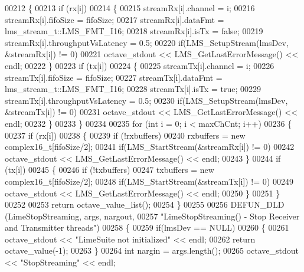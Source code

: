 \begin{DoxyCode}
00212     \{
00213         \textcolor{keywordflow}{if} (rx[i])
00214         \{
00215             streamRx[i].channel = i;
00216             streamRx[i].fifoSize = fifoSize;
00217             streamRx[i].dataFmt = lms_stream_t::LMS_FMT_I16;
00218             streamRx[i].isTx = \textcolor{keyword}{false};
00219             streamRx[i].throughputVsLatency = 0.5;
00220             \textcolor{keywordflow}{if}(LMS_SetupStream(lmsDev, &streamRx[i]) != 0)
00221                 octave\_stdout << LMS_GetLastErrorMessage() << endl;
00222         \}
00223         \textcolor{keywordflow}{if} (tx[i])
00224         \{
00225             streamTx[i].channel = i;
00226             streamTx[i].fifoSize = fifoSize;
00227             streamTx[i].dataFmt = lms_stream_t::LMS_FMT_I16;
00228             streamTx[i].isTx = \textcolor{keyword}{true};
00229             streamTx[i].throughputVsLatency = 0.5;
00230             \textcolor{keywordflow}{if}(LMS_SetupStream(lmsDev, &streamTx[i]) != 0)
00231                 octave\_stdout << LMS_GetLastErrorMessage() << endl;
00232         \}
00233     \}
00234 
00235     \textcolor{keywordflow}{for} (\textcolor{keywordtype}{int} i = 0; i < maxChCnt; i++)
00236     \{
00237         \textcolor{keywordflow}{if} (rx[i])
00238         \{
00239             \textcolor{keywordflow}{if} (!rxbuffers)
00240                 rxbuffers = \textcolor{keyword}{new} complex16_t[fifoSize/2];
00241             \textcolor{keywordflow}{if}(LMS_StartStream(&streamRx[i]) != 0)
00242                 octave\_stdout << LMS_GetLastErrorMessage() << endl;
00243         \}
00244         \textcolor{keywordflow}{if} (tx[i])
00245         \{
00246             \textcolor{keywordflow}{if} (!txbuffers)
00247                 txbuffers = \textcolor{keyword}{new} complex16_t[fifoSize/2];
00248             \textcolor{keywordflow}{if}(LMS_StartStream(&streamTx[i]) != 0)
00249                 octave\_stdout << LMS_GetLastErrorMessage() << endl;
00250         \}
00251     \}
00252 
00253     \textcolor{keywordflow}{return} octave\_value\_list();
00254 \}
00255 
00256 DEFUN_DLD (LimeStopStreaming, args, nargout,
00257 \textcolor{stringliteral}{"LimeStopStreaming() - Stop Receiver and Transmitter threads"})
00258 \{
00259     \textcolor{keywordflow}{if}(lmsDev == NULL)
00260     \{
00261         octave\_stdout << \textcolor{stringliteral}{"LimeSuite not initialized"} << endl;
00262         \textcolor{keywordflow}{return} octave\_value(-1);
00263     \}
00264     \textcolor{keywordtype}{int} nargin = args.length();
00265     octave\_stdout << \textcolor{stringliteral}{"StopStreaming"} << endl;

\end{DoxyCode}
